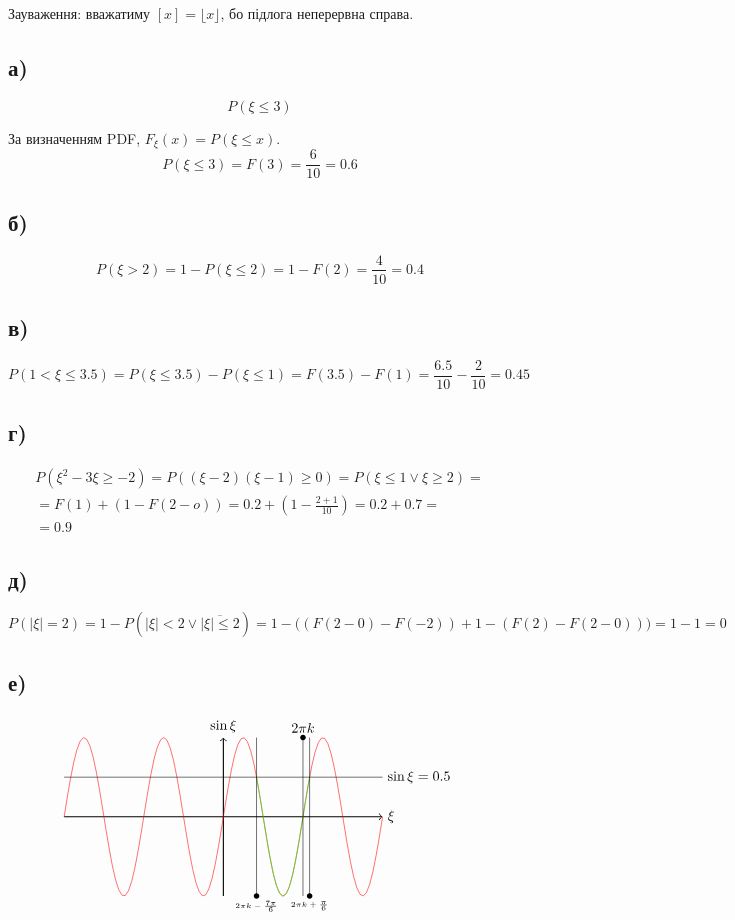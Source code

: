 \documentclass[11pt, a4paper]{article} %
\begin{document}
\begin{mdframed}
    Зауваження: вважатиму $[x] = \lfloor x \rfloor$, бо підлога неперервна справа.
\end{mdframed}

\subsection*{а)}
$$P(\xi \le 3)$$

За визначенням PDF, $F_\xi(x) = P(\xi \le x)$.
$$P(\xi \le 3) = F(3) = \frac{6}{10} = 0.6$$

\subsection*{б)}
$$P(\xi > 2) = 1-P(\xi \le 2) = 1 - F(2) = \frac{4}{10} = 0.4$$

\subsection*{в)}
$$P(1<\xi\le 3.5) = P(\xi \le 3.5) - P(\xi \le 1) = F(3.5) - F(1) = \frac{6.5}{10} - \frac{2}{10} = 0.45$$

\subsection*{г)}
$$\begin{gathered}
    P(\xi^2 - 3\xi \ge -2) = P((\xi-2)(\xi-1)\ge 0) = P(\xi \le 1 \vee \xi \ge 2) = \\
    = F(1) + (1-F(2-o)) = 0.2 + (1-\frac{2+1}{10}) = 0.2 + 0.7 = \\
    = 0.9
\end{gathered}$$

\subsection*{д)}
$$P(|\xi|=2) = 1-P(|\xi|< 2 \vee \overline{|\xi|\le 2}) = 1-\bigl( (F(2-0)-F(-2)) + 1 - (F(2)-F(2-0)) \bigr) = 1-1 = 0$$

\subsection*{е)}

$$\begin{tikzpicture}
    \draw[thick, ->] (-4,0) -- (4,0) node[right] {$\xi$};
    \draw[thick, ->] (0,-2) -- (0,2) node[above] {$\sin \xi$};
    \draw[red] plot[%
        scale=1,
        samples=100,
        domain=-4:4,
    ] (\x,{2*sin(deg(pi * \x))});
    \draw[green] plot[%
        scale=1,
        samples=50,
        domain=5 / 6 : 2 + 1/6,
    ] (\x,{2*sin(deg(pi * \x))});
    \draw (-4,1) -- (4,1) node[right] {$\sin \xi = 0.5$};
    \draw[thin] (2,-2) -- (2,2) node[above] {$2\pi k$};
    \draw[thin] ({{5/6}},-2)  node[below] {\tiny $2\pi k - \frac{7\pi}{6}$} -- ({{5/6}},2);
    \draw[thin] ({{2+1/6}},-2) node[below] {\tiny $2\pi k + \frac{\pi}{6}$}-- ({{2+1/6}},2);
    \fill ({{5/6}},-2) circle (2pt);
    \fill ({{2+1/6}},-2) circle (2pt);
    \fill (2,2) circle (2pt);
\end{tikzpicture}$$
\end{document}
